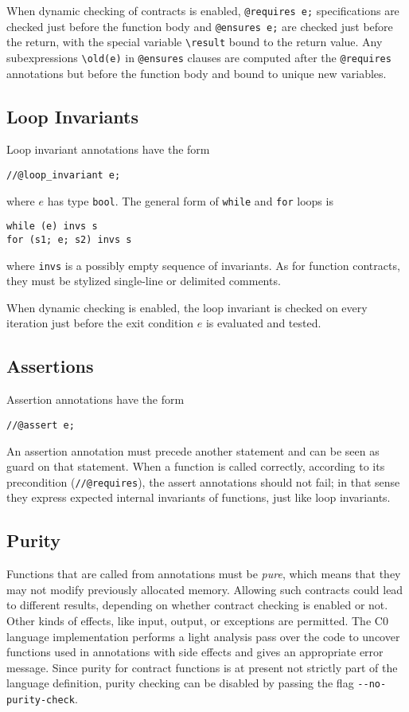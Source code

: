 \documentclass[11pt]{article}
\newcommand{\tbool}{\texttt{bool}}
\begin{document}
When dynamic checking of contracts is enabled,
\verb'@requires e;' specifications are checked just
before the function body and \verb'@ensures e;'
are checked just before the return, with the special
variable \verb'\result' bound to the return value.
Any subexpressions \verb'\old(e)' in \verb'@ensures' clauses
are computed after the \verb'@requires' annotations
but before the function body and bound to unique
new variables.

\subsection{Loop Invariants}

Loop invariant annotations have the form
\begin{verbatim}
//@loop_invariant e;
\end{verbatim}
where $e$ has type \tbool.  The general form of \verb'while'
and \verb'for' loops is
\begin{verbatim}
while (e) invs s
for (s1; e; s2) invs s
\end{verbatim}
where \verb'invs' is a possibly empty sequence of invariants.
As for function contracts, they must be stylized single-line
or delimited comments.

When dynamic checking is enabled, the loop invariant is checked on
every iteration just before the exit condition $e$ is evaluated and
tested.

\subsection{Assertions}

Assertion annotations have the form
\begin{verbatim}
//@assert e;
\end{verbatim}
An assertion annotation must precede another statement and can be seen
as guard on that statement.  When a function is called correctly,
according to its precondition (\verb'//@requires'), the assert
annotations should not fail; in that sense they express expected
internal invariants of functions, just like loop invariants.

\subsection{Purity}

Functions that are called from annotations must be \emph{pure}, which
means that they may not modify previously allocated memory.  Allowing
such contracts could lead to different results, depending on whether
contract checking is enabled or not.  Other kinds of effects, like
input, output, or exceptions are permitted.  The C0 language
implementation performs a light analysis pass over the code to uncover
functions used in annotations with side effects and gives an
appropriate error message.  Since purity for contract functions is at
present not strictly part of the language definition, purity checking
can be disabled by passing the flag \verb'--no-purity-check'.
\end{document}
